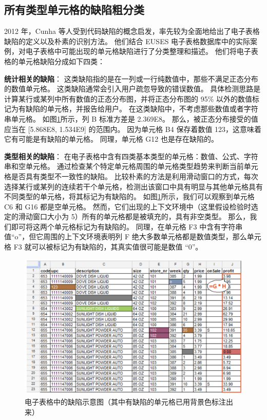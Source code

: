 \subsection{所有类型单元格的缺陷粗分类}
2012 年，Cunha 等人\cite{cunha2012towards}受到代码缺陷的概念启发，率先较为全面地给出了电子表格缺陷的定义以及朴素的识别方法。
他们结合 EUSES 电子表格数据库中的实际案例，对电子表格中可能出现的单元格缺陷进行了分类整理和描述。
他们将电子表格的单元格缺陷分成如下四类：

\textbf{统计相关的缺陷}：
这类缺陷指的是在一列或一行纯数值中，那些不满足正态分布的数值单元格。
这类缺陷通常会引入用户疏忽导致的错误数值。
具体检测思路是计算某行或某列中所有数值的正态分布图，并将正态分布图的 95\% 以外的数值标记为有缺陷的单元格，并报告给用户。
在这类缺陷中，不考虑那些数值或者字符串单元格。
如图\ref{figure-valuesmell}所示，列 B 标准方差是 2.369E8。
那么，被正态分布接受的值应当在 [5.868E8, 1.534E9] 的范围内。
因为单元格 B4 保存着数值 123，这意味着它有可能是有缺陷的单元格。
同理，单元格 G12 也是存在缺陷的。

\textbf{类型相关的缺陷}：
在电子表格中含有四类基本类型的单元格：数值、公式、字符串和空单元格。
通过检查某个特定单元格周围的单元格类型趋势来判断当前单元格是否具有类型不一致性的缺陷。
比较朴素的方法是利用滑动窗口的方式，每次选择某行或某列的连续若干个单元格，检测出该窗口中具有明显与其他单元格具有不同类型的单元格，将其标记为有缺陷的。
如图\ref{figure-valuesmell}所示，我们可以观察到单元格 C6 和 G16 都是空单元格。
然而，它们出现的上下文环境中（这里假设检验时选定的滑动窗口大小为 5）所有的单元格都是被填充的，具有非空类型。
那么，我们即可将这两个单元格标记为有缺陷的。
同理，在单元格 F3 中含有字符串值“o”，但它周围的上下文环境表明列 F 绝大多数单元格都是数值类型，那么单元格 F3 就可以被标记为有缺陷的，其真实值很可能是数值 “0”。

\begin{figure}[tp]    
    \centering
    \includegraphics[width=\textwidth]{figure/relatedwork/valueSmell.png}
    \caption{电子表格中的缺陷示意图（其中有缺陷的单元格已用背景色标注出来）}
    \label{figure-valuesmell}
\end{figure}

